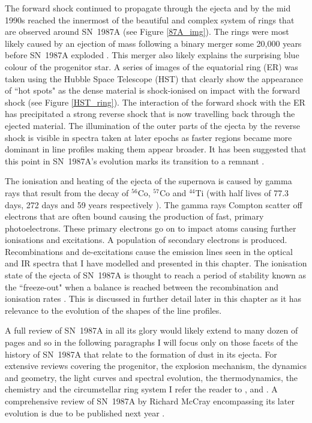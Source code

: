 The forward shock continued to propagate through the ejecta and by the mid 1990s reached the innermost of the beautiful and complex system of rings that are observed around SN~1987A (see Figure \ref{87A_img}).  The rings were most likely caused by an ejection of mass following a binary merger some 20,000 years before SN~1987A exploded \citep{Morris2005,Fitzpatrick2013}.  This merger also likely explains the surprising blue colour of the progenitor star.  A series of images of the equatorial ring (ER) was taken using the Hubble Space Telescope (HST) that clearly show the appearance of ``hot spots" as the dense material is shock-ionised on impact with the forward shock (see Figure \ref{HST_ring}).  The interaction of the forward shock with the ER has precipitated a strong reverse shock that is now travelling back through the ejected material.  The illumination of the outer parts of the ejecta by the reverse shock is visible in spectra taken at later epochs as faster regions became more dominant in line profiles making them appear broader.  It has been suggested that this point in SN~1987A's evolution marks its transition to a remnant \citep{McCray2003}.

The ionisation and heating of the ejecta of the supernova is caused by gamma rays that result from the decay of $^{56}$Co, $^{57}$Co and $^{44}$Ti (with half lives of 77.3 days, 272 days and 59 years respectively \citep{Manuel2002}).  The gamma rays Compton scatter off electrons that are often bound causing the production of fast, primary photoelectrons. These primary electrons go on to impact atoms causing further ionisations and excitations. A population of secondary electrons is produced.  Recombinations and de-excitations cause the emission lines seen in the optical and IR spectra that I have modelled and presented in this chapter.  The ionisation state of the ejecta of SN~1987A is thought to reach a period of stability known as the ``freeze-out" when a balance is reached between the recombination and ionisation rates \citep{Danziger1991,Kozma1998a,Fransson2013}.  This is discussed in further detail later in this chapter as it has relevance to the evolution of the shapes of the line profiles.

A full review of SN~1987A in all its glory would likely extend to many dozen of pages and so in the following paragraphs I will focus only on those facets of the history of SN~1987A that relate to the formation of dust in its ejecta.  For extensive reviews covering the progenitor, the explosion mechanism, the dynamics and geometry, the light curves and spectral evolution, the thermodynamics, the chemistry and the circumstellar ring system I refer the reader to \citet{Arnett1989}, \citet{McCray1993} and \citet{McCray2003}.  A comprehensive review of SN~1987A by Richard McCray encompassing its later evolution is due to be published next year \citep{McCray2016}.


